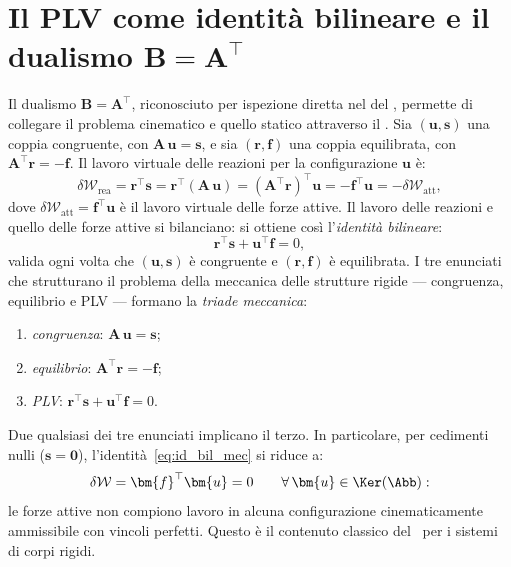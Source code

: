 \section{Il PLV come identità bilineare e il dualismo \texorpdfstring{$\bm{B} = \bm{A}^{\top}$}{B = A\textasciicircum T}}
\label{sec:dualismo}

Il dualismo $\bm{B} = \bm{A}^{\top}$, riconosciuto per
ispezione diretta nel  del
, permette di collegare
il problema cinematico e quello statico attraverso il \PLV. Sia $(\bm{u}, \bm{s})$ una
coppia congruente, con $\bm{A}\,\bm{u} = \bm{s}$, e sia
$(\bm{r}, \bm{f})$ una coppia equilibrata, con
$\bm{A}^{\top}\bm{r} = -\bm{f}$. Il lavoro virtuale
delle reazioni per la configurazione $\bm{u}$ è:
\begin{equation}
	\delta\mathcal{W}_{\mathrm{rea}} =
	\bm{r}^{\top}\bm{s} =
	\bm{r}^{\top}(\bm{A}\,\bm{u}) =
	(\bm{A}^{\top}\bm{r})^{\top}\bm{u} =
	-\bm{f}^{\top}\bm{u} =
	-\delta\mathcal{W}_{\mathrm{att}},
\end{equation}
dove $\delta\mathcal{W}_{\mathrm{att}} = \bm{f}^{\top}\bm{u}$
è il lavoro virtuale delle forze attive. Il lavoro delle
reazioni e quello delle forze attive si bilanciano: si
ottiene così l'\emph{identità bilineare}:
\begin{equation}\label{eq:id_bil_mec}
	\boxed{\bm{r}^{\top}\bm{s} + \bm{u}^{\top}\bm{f} = 0,}
\end{equation}
valida ogni volta che $(\bm{u}, \bm{s})$ è congruente e
$(\bm{r}, \bm{f})$ è equilibrata. I tre enunciati che
strutturano il problema della meccanica delle strutture
rigide --- congruenza, equilibrio e PLV --- formano la
\emph{triade meccanica}:
\begin{enumerate}[label=(\roman*), noitemsep]
	\item \emph{congruenza}: $\bm{A}\,\bm{u} = \bm{s}$;
	\item \emph{equilibrio}: $\bm{A}^{\top}\bm{r} = -\bm{f}$;
	\item \emph{PLV}: $\bm{r}^{\top}\bm{s} +
	\bm{u}^{\top}\bm{f} = 0$.
\end{enumerate}
Due qualsiasi dei tre enunciati implicano il terzo. In
particolare, per cedimenti nulli ($\bm{s} = \bm{0}$),
l'identità~\eqref{eq:id_bil_mec} si riduce a:
\begin{equation}
	\delta\mathcal{W} =
	\bm{f}^{\top}\bm{u} = 0
	\qquad
	\forall\,\bm{u} \in \Ker(\Abb):
\end{equation}
le forze attive non compiono lavoro in alcuna
configurazione cinematicamente ammissibile con vincoli
perfetti. Questo è il contenuto classico del \PLV\ per
i sistemi di corpi rigidi.



